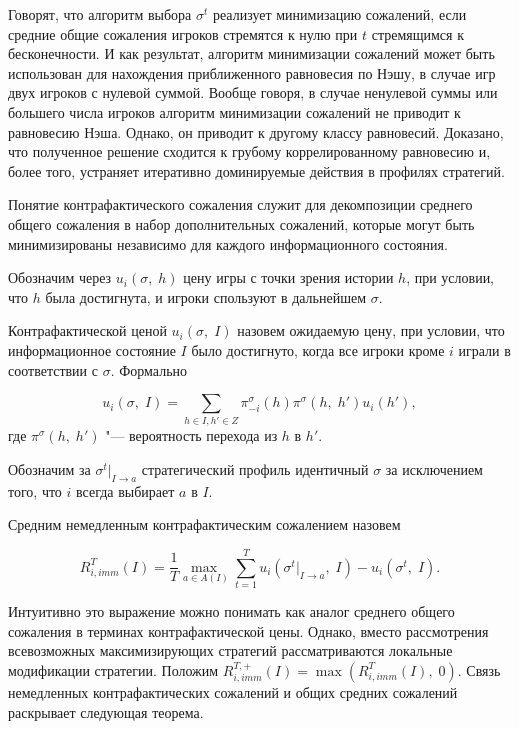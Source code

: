 Говорят, что алгоритм выбора $\sigma^t$ реализует минимизацию сожалений, если средние общие сожаления игроков стремятся к нулю при $t$ стремящимся к бесконечности. И как результат, алгоритм минимизации сожалений может быть использован для нахождения приближенного равновесия по Нэшу, в случае игр двух игроков с нулевой суммой. Вообще говоря, в случае ненулевой суммы или большего числа игроков алгоритм минимизации сожалений не приводит к равновесию Нэша. Однако, он приводит к другому классу равновесий. Доказано, что полученное решение сходится к грубому коррелированному равновесию и, более того,  устраняет итеративно доминируемые действия в профилях стратегий\cite{RGibson}.

Понятие контрафактического сожаления служит для декомпозиции среднего общего сожаления в набор дополнительных сожалений, которые могут быть минимизированы независимо для каждого информационного состояния. 

Обозначим через $u_i(\sigma,\;h)$ цену игры с точки зрения истории $h$, при условии, что $h$ была достигнута, и игроки спользуют в дальнейшем $\sigma$. 

\begin{defin}
	Контрафактической ценой $u_i(\sigma,\;I)$ назовем ожидаемую цену, при условии, что информационное состояние $I$ было достигнуто, когда все игроки кроме $i$ играли в соответствии с $\sigma$. Формально 
\end{defin} 
\begin{equation}
	u_i(\sigma,\;I)=\sum_{h\in I,h'\in Z}\pi_{-i}^\sigma(h)\pi^\sigma(h,\;h')u_i(h'),
\end{equation}
где $\pi^\sigma(h,\;h')$ "--- вероятность перехода из $h$ в $h'$.

Обозначим за $\sigma^t |_{I \to a}$ стратегический профиль идентичный $\sigma$ за исключением того, что $i$ всегда выбирает $a$ в $I$. 

Средним немедленным контрафактическим сожалением назовем 

\begin{equation}\label{Sych_eq1}
	R_{i,imm}^T(I) = \frac{1}{T}\underset{a\in A(I)}{\max\;}\sum_{t=1}^{T}u_i(\sigma^t |_{I \to a},\;I)-u_i(\sigma^t,\;I).
\end{equation}

Интуитивно это выражение можно понимать как аналог среднего общего сожаления в терминах контрафактической цены. Однако, вместо рассмотрения всевозможных максимизирующих стратегий рассматриваются локальные модификации стратегии. Положим $R_{i,imm}^{T,+}(I) = \max (R_{i,imm}^{T}(I),\;0)$. Связь немедленных контрафактических сожалений и общих средних сожалений раскрывает следующая теорема. 

